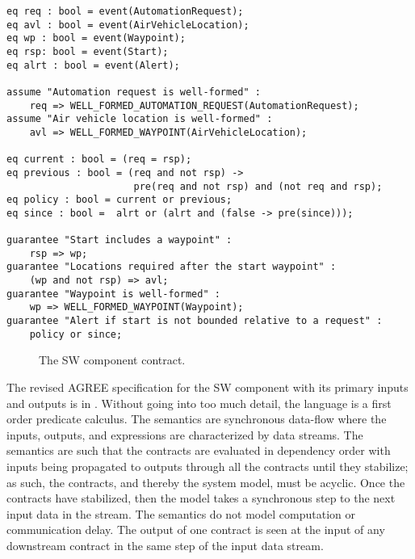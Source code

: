 \newsavebox{\sw}
\begin{lrbox}{\sw}
\begin{lstlisting}[style=agree]
eq req : bool = event(AutomationRequest);
eq avl : bool = event(AirVehicleLocation);
eq wp : bool = event(Waypoint);
eq rsp: bool = event(Start);
eq alrt : bool = event(Alert);
            
assume "Automation request is well-formed" :
    req => WELL_FORMED_AUTOMATION_REQUEST(AutomationRequest);
assume "Air vehicle location is well-formed" :
    avl => WELL_FORMED_WAYPOINT(AirVehicleLocation);

eq current : bool = (req = rsp);
eq previous : bool = (req and not rsp) ->
                      pre(req and not rsp) and (not req and rsp);
eq policy : bool = current or previous;
eq since : bool =  alrt or (alrt and (false -> pre(since)));

guarantee "Start includes a waypoint" :
    rsp => wp;
guarantee "Locations required after the start waypoint" :
    (wp and not rsp) => avl;
guarantee "Waypoint is well-formed" :
    wp => WELL_FORMED_WAYPOINT(Waypoint);
guarantee "Alert if start is not bounded relative to a request" :
    policy or since;
\end{lstlisting}
\end{lrbox}

\begin{figure}
  \begin{center}
    \scalebox{0.60}{\usebox{\sw}}
  \end{center}
  \caption{The SW component contract.}
  \label{fig:sw}
\end{figure}

The revised AGREE specification for the SW component with its primary inputs and outputs is in . Without going into too much detail, the language is a first order predicate calculus. The semantics are synchronous data-flow where the inputs, outputs, and expressions are characterized by data streams. The semantics are such that the contracts are evaluated in dependency order with inputs being propagated to outputs through all the contracts until they stabilize; as such, the contracts, and thereby the system model, must be acyclic. Once the contracts have stabilized, then the model takes a synchronous step to the next input data in the stream. The semantics do not model computation or communication delay. The output of one contract is seen at the input of any downstream contract in the same step of the input data stream. 

